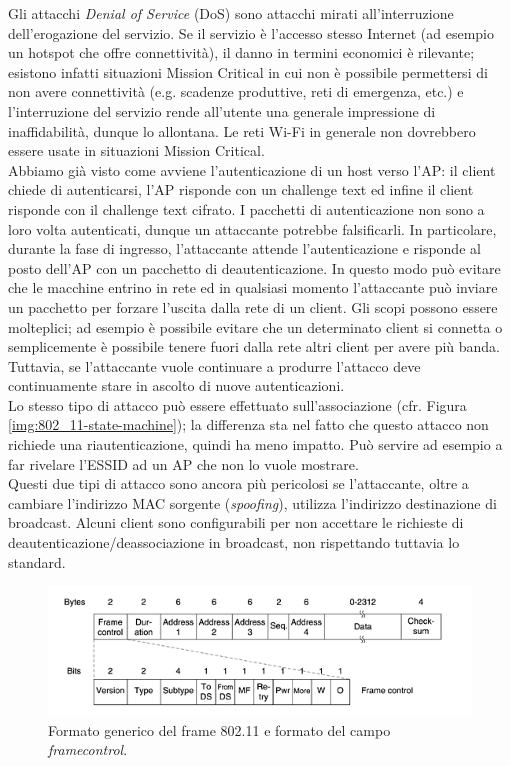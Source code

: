 Gli attacchi \textit{Denial of Service} (DoS) sono attacchi mirati all'interruzione dell'erogazione del servizio. Se il servizio è l'accesso stesso Internet (ad esempio un hotspot che offre connettività), il danno in termini economici è rilevante; esistono infatti situazioni Mission Critical in cui non è possibile permettersi di non avere connettività (e.g. scadenze produttive, reti di emergenza, etc.) e l'interruzione del servizio rende all'utente una generale impressione di inaffidabilità, dunque lo allontana. Le reti Wi-Fi in generale non dovrebbero essere usate in situazioni Mission Critical.\\
Abbiamo già visto come avviene l'autenticazione di un host verso l'AP: il client chiede di autenticarsi, l'AP risponde con un challenge text ed infine il client risponde con il challenge text cifrato. I pacchetti di autenticazione non sono a loro volta autenticati, dunque un attaccante potrebbe falsificarli. In particolare, durante la fase di ingresso, l'attaccante attende l'autenticazione e risponde al posto dell'AP con un pacchetto di deautenticazione. In questo modo può evitare che le macchine entrino in rete ed in qualsiasi momento l'attaccante può inviare un pacchetto per forzare l'uscita dalla rete di un client. Gli scopi possono essere molteplici; ad esempio è possibile evitare che un determinato client si connetta o semplicemente è possibile tenere fuori dalla rete altri client per avere più banda. Tuttavia, se l'attaccante vuole continuare a produrre l'attacco deve continuamente stare in ascolto di nuove autenticazioni.\\
Lo stesso tipo di attacco può essere effettuato sull'associazione (cfr. Figura \ref{img:802_11-state-machine}); la differenza sta nel fatto che questo attacco non richiede una riautenticazione, quindi ha meno impatto. Può servire ad esempio a far rivelare l'ESSID ad un AP che non lo vuole mostrare.\\
Questi due tipi di attacco sono ancora più pericolosi se l'attaccante, oltre a cambiare l'indirizzo MAC sorgente (\textit{spoofing}), utilizza l'indirizzo destinazione di broadcast. Alcuni client sono configurabili per non accettare le richieste di deautenticazione/deassociazione in broadcast, non rispettando tuttavia lo standard.
\begin{figure}[htbp]
	\centering
	\includegraphics[scale = 0.8]{images/802_11-frame}
	\caption{Formato generico del frame 802.11 e formato del campo \textit{framecontrol}.}
	\label{img:802_11-frame}
\end{figure}
